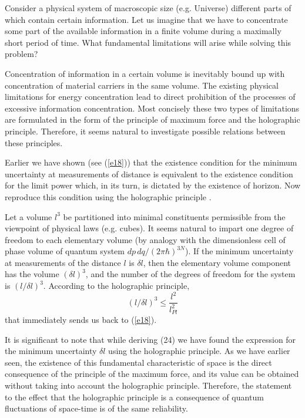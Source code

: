 \documentclass [12pt]{article}
\begin{document}
Consider a physical system of macroscopic size (e.g. Universe)  different parts of which contain certain information. Let us imagine that we have to concentrate some part of the available information in a finite volume during a maximally short period of time. What fundamental limitations will  arise while solving this problem?

Concentration of information in a certain volume is inevitably bound up with concentration of material carriers in the same volume. The existing physical limitations for  energy concentration  lead to direct prohibition of the processes of   excessive information concentration. Most concisely these two types of limitations  are formulated in the form of the principle of maximum force and the holographic principle. Therefore, it seems natural to investigate possible relations between these principles.

Earlier we have shown (see (\ref{e18})) that the existence condition for the minimum uncertainty at measurements of distance is equivalent to the existence condition for the  limit power which, in its turn, is dictated by the existence of horizon. Now reproduce this condition using the holographic principle \cite{s23}.

Let a  volume  ${l^3}$ be partitioned into minimal constituents permissible from the viewpoint of physical laws (e.g. cubes). It seems natural to impart one degree of freedom to each elementary volume (by analogy with the dimensionless cell of phase volume of quantum system $dp \,dq/{\left( {2\pi \hbar } \right)^{3N}}$). If the minimum uncertainty at measurements of the distance  $l$ is $\delta l$, then the elementary volume component  has the volume ${\left( {\delta l} \right)^3}$, and the number of the  degrees of freedom for the system is ${\left( {l/\delta l} \right)^3}$. According to the holographic principle,
\begin{equation}\label{e24}
  {\left( {l/\delta l} \right)^3} \le \frac{{{l^2}}}{{l_{Pl}^2}}
\end{equation}
that immediately sends us back to (\ref{e18}).

It is significant to note that while deriving \cite{s24} (24) we have found the expression for the minimum uncertainty $\delta l$ using  the holographic principle.  As we have earlier seen, the existence of this fundamental characteristic of space is the direct consequence of the principle of the maximum force, and its value can be obtained without taking into account the holographic principle. Therefore, the statement to the effect that the holographic principle is a consequence of quantum fluctuations of space-time \cite{s24} is of the same reliability.
\end{document}
